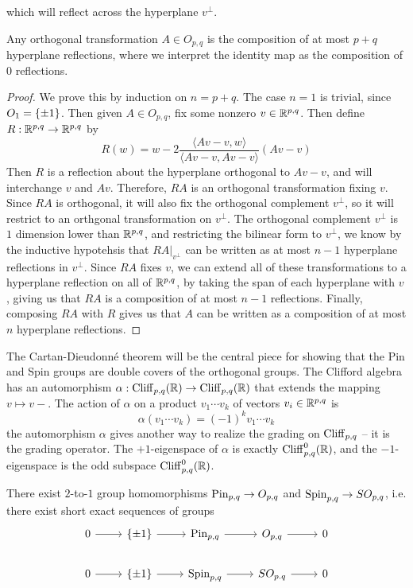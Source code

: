 which will reflect across the hyperplane $v^\perp$.
%
\begin{thm}
Any orthogonal transformation $A \in O_{p,q}$ is the composition
of at most $p+q$ hyperplane reflections, where we interpret the identity map as the
composition of $0$ reflections.
\end{thm}
%
\begin{proof}
We prove this by induction on $n = p+q$. The case $n=1$ is trivial, since
$O_1 = \left\lbrace \pm 1 \right\rbrace$. Then given $A \in O_{p,q}$, fix some nonzero $v \in \mathbb{R}^{p,q}$.
Then define $R : \mathbb{R}^{p,q} \to \mathbb{R}^{p,q}$ by
\[
R(w) = w - 2 \frac{\langle Av - v,w \rangle}{\langle Av -v, Av - v\rangle}(Av - v)
\]
Then $R$ is a reflection about the hyperplane orthogonal to $Av - v$,
and will interchange $v$ and $Av$. Therefore, $RA$ is an orthogonal transformation
fixing $v$. Since $RA$ is orthogonal, it will also fix the orthogonal complement
$v^\perp$, so it will restrict to an orthgonal transformation on $v^\perp$. The
orthogonal complement $v^\perp$ is $1$ dimension lower than $\mathbb{R}^{p,q}$, and restricting
the bilinear form to $v^\perp$, we know by the inductive hypotehsis that
$RA\vert_{v^\perp}$ can be written as at most $n-1$ hyperplane reflections in
$v^\perp$. Since $RA$ fixes $v$, we can extend all of these transformations to
a hyperplane reflection on all of $\mathbb{R}^{p,q}$, by taking the span of each hyperplane
with $v$, giving us that $RA$ is a composition of at most $n-1$ reflections. Finally,
composing $RA$ with $R$ gives us that $A$ can be written as a composition of at most
$n$ hyperplane reflections.
\end{proof}
The Cartan-Dieudonn\'e theorem will be the central piece for showing that the
Pin and Spin groups are double covers of the orthogonal groups. The Clifford
algebra has an automorphism
$\alpha : \operatorname{Cliff}_{p,q}(\mathbb{R}) \to \operatorname{Cliff}_{p,q}(\mathbb{R})$ that extends the mapping
$v \mapsto v-$. The action of $\alpha$ on a product $v_1\cdots v_k$ of vectors
$v_i \in \mathbb{R}^{p,q}$ is
\[
\alpha(v_1\cdots v_k) = (-1)^k v_1\cdots v_k
\]
the automorphism $\alpha$ gives another way to realize the grading on
$\operatorname{Cliff}_{p,q}$ -- it is the grading operator. The $+1$-eigenspace of $\alpha$
is exactly $\operatorname{Cliff}_{p,q}^0(\mathbb{R})$, and the $-1$-eigenspace is the odd subspace
$\operatorname{Cliff}_{p,q}^0(\mathbb{R})$.
%
\begin{thm}
There exist $2$-to-$1$ group homomorphisms $\mathrm{Pin}_{p,q} \to O_{p,q}$ and
$\mathrm{Spin}_{p,q} \to SO_{p,q}$, i.e. there exist short exact sequences of groups
\[\begin{tikzcd}
0 \ar[r] & \set{\pm 1} \ar[r] & \Pin_{p,q} \ar[r] & O_{p,q} \ar[r] & 0 \\
0 \ar[r] & \set{\pm 1} \ar[r] &\Spin_{p,q} \ar[r] & SO_{p.q} \ar[r] & 0
\end{tikzcd}\]
\end{thm}
